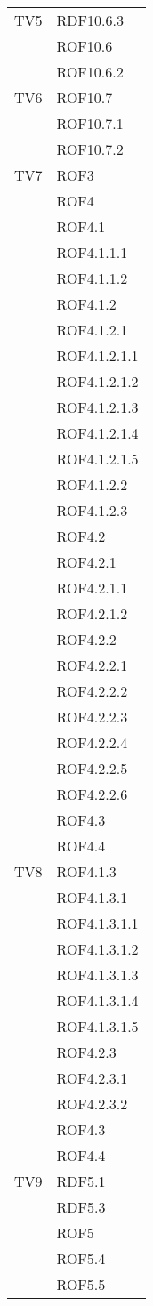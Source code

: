 \begin{center}
\begin{longtable}{|p{7cm}|p{7cm}|}
\midrule
TV5
& RDF10.6.3\\
& ROF10.6\\
& ROF10.6.2\\

\midrule
TV6
& ROF10.7\\
& ROF10.7.1\\
& ROF10.7.2\\

\midrule
TV7
& ROF3\\
& ROF4\\
& ROF4.1\\
& ROF4.1.1.1\\
& ROF4.1.1.2\\
& ROF4.1.2\\
& ROF4.1.2.1\\
& ROF4.1.2.1.1\\
& ROF4.1.2.1.2\\
& ROF4.1.2.1.3\\
& ROF4.1.2.1.4\\
& ROF4.1.2.1.5\\
& ROF4.1.2.2\\
& ROF4.1.2.3\\
& ROF4.2\\
& ROF4.2.1\\
& ROF4.2.1.1\\
& ROF4.2.1.2\\
& ROF4.2.2\\
& ROF4.2.2.1\\
& ROF4.2.2.2\\
& ROF4.2.2.3\\
& ROF4.2.2.4\\
& ROF4.2.2.5\\
& ROF4.2.2.6\\
& ROF4.3\\
& ROF4.4\\

\midrule
TV8
& ROF4.1.3\\
& ROF4.1.3.1\\
& ROF4.1.3.1.1\\
& ROF4.1.3.1.2\\
& ROF4.1.3.1.3\\
& ROF4.1.3.1.4\\
& ROF4.1.3.1.5\\
& ROF4.2.3\\
& ROF4.2.3.1\\
& ROF4.2.3.2\\
& ROF4.3\\
& ROF4.4\\

\midrule
TV9
& RDF5.1\\
& RDF5.3\\
& ROF5\\
& ROF5.4\\
& ROF5.5\\

\end{longtable}
\end{center}


